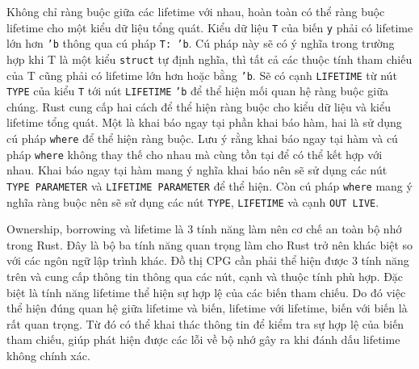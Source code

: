 Không chỉ ràng buộc giữa các lifetime với nhau, hoàn toàn có thể ràng buộc lifetime cho một kiểu dữ liệu tổng quát.
Kiểu dữ liệu \texttt{T} của biến \texttt{y} phải có lifetime lớn hơn \texttt{'b} thông qua cú pháp \texttt{T: 'b}.
Cú pháp này sẽ có ý nghĩa trong trường hợp khi T là một kiểu \texttt{struct} tự định nghĩa, thì tất cả các thuộc tính tham chiếu của T cũng phải có lifetime lớn hơn hoặc bằng \texttt{'b}.
Sẽ có cạnh \texttt{LIFETIME} từ nút \texttt{TYPE} của kiểu \texttt{T} tới nút \texttt{LIFETIME} \texttt{'b} để thể hiện mối quan hệ ràng buộc giữa chúng.
Rust cung cấp hai cách để thể hiện ràng buộc cho kiểu dữ liệu và kiểu lifetime tổng quát.
Một là khai báo ngay tại phần khai báo hàm, hai là sử dụng cú pháp \texttt{where} để thể hiện ràng buộc.
Lưu ý rằng khai báo ngay tại hàm và cú pháp \texttt{where} không thay thế cho nhau mà cùng tồn tại để có thể kết hợp với nhau.
Khai báo ngay tại hàm mang ý nghĩa khai báo nên sẽ sử dụng các nút \texttt{TYPE PARAMETER} và \texttt{LIFETIME PARAMETER} để thể hiện.
Còn cú pháp \texttt{where} mang ý nghĩa ràng buộc nên sẽ sử dụng các nút \texttt{TYPE}, \texttt{LIFETIME} và cạnh \texttt{OUT LIVE}.

Ownership, borrowing và lifetime là 3 tính năng làm nên cơ chế an toàn bộ nhớ trong Rust.
Đây là bộ ba tính năng quan trọng làm cho Rust trở nên khác biệt so với các ngôn ngữ lập trình khác.
Đồ thị CPG cần phải thể hiện được 3 tính năng trên và cung cấp thông tin thông qua các nút, cạnh và thuộc tính phù hợp.
Đặc biệt là tính năng lifetime thể hiện sự hợp lệ của các biến tham chiếu.
Do đó việc thể hiện đúng quan hệ giữa lifetime và biến, lifetime với lifetime, biến với biến là rất quan trọng.
Từ đó có thể khai thác thông tin để kiểm tra sự hợp lệ của biến tham chiếu, giúp phát hiện được các lỗi về bộ nhớ gây ra khi đánh dấu lifetime không chính xác.

